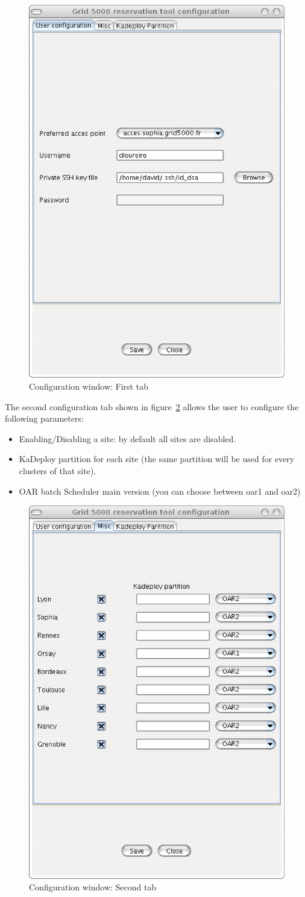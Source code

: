 \begin{figure}[H]
\centering
\includegraphics[width=0.4\linewidth]{figures/GRUDU_conf1.eps}
\caption{Configuration window: First tab}
\label{fig:cfg_tab1}
\end{figure}

The second configuration tab shown in figure~\ref{fig:cfg_tab2} allows the user
to configure the following parameters:
\begin{itemize}
  \item Enabling/Disabling a site: by default all sites are disabled.
  \item KaDeploy partition for each site (the same partition will be used for
  every clusters of that site).
  \item OAR batch Scheduler main version (you can choose between oar1 and oar2)
\end{itemize}

\begin{figure}[H]
\centering
\includegraphics[width=0.4\linewidth]{figures/GRUDU_conf2.eps}
\caption{Configuration window: Second tab}
\label{fig:cfg_tab2}
\end{figure}

